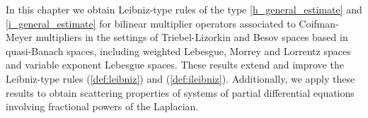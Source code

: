                                                                                                                                                                                                                                                                                                                                                                                                                

In this chapter we obtain Leibniz-type rules of the type \eqref{h_general_estimate} and \eqref{i_general_estimate} for bilinear multiplier operators associated to Coifman-Meyer multipliers in the settings of Triebel-Lizorkin and Besov spaces based in quasi-Banach spaces, including weighted Lebesgue, Morrey and Lorrentz spaces and variable exponent Lebesgue spaces. These results extend and improve the Leibniz-type rules (\ref{def:leibniz}) and (\ref{def:ileibniz}).  Additionally, we apply these results to obtain scattering properties of systems of partial differential equations involving fractional powers of the Laplacian. 

